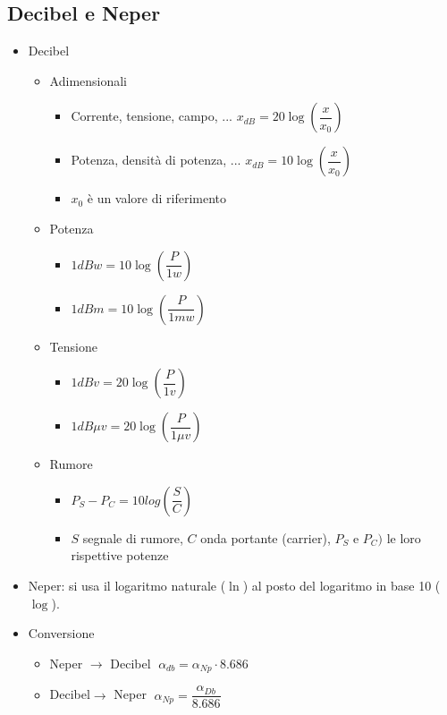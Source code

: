 \documentclass{article}
\begin{document}
\subsection{Decibel e Neper}
\begin{itemize}
	\item Decibel
	\begin{itemize}
		\item Adimensionali
		\begin{itemize}
			\item Corrente, tensione, campo, ... \( x_{dB} = 20 \log\left(\dfrac{x}{x_0}\right) \)
			\item Potenza, densità di potenza, ... \( x_{dB} = 10 \log\left(\dfrac{x}{x_0}\right) \)
			\item \(x_0\) è un valore di riferimento
		\end{itemize}
		\item Potenza 
		\begin{itemize}
			\item \(1 dBw = 10 \log\left(\dfrac{P}{1w}\right) \)
			\item \(1 dBm = 10 \log\left(\dfrac{P}{1mw}\right) \)
		\end{itemize}
		\item Tensione 
		\begin{itemize}
			\item \(1 dBv = 20 \log\left(\dfrac{P}{1v}\right) \)
			\item \(1 dB \mu v = 20 \log\left(\dfrac{P}{1 \mu v}\right) \)
		\end{itemize}
		\item Rumore
		\begin{itemize}
			\item \(P_S - P_C = 10 log \left( \dfrac{S}{C} \right) \)
			\item \(S\) segnale di rumore, \(C\) onda portante (carrier), \(P_S\) e \(P_C)\) le loro rispettive potenze
		\end{itemize}
	\end{itemize}
	\item Neper: si usa il logaritmo naturale (\( \ln \)) al posto del logaritmo in base 10 (\(\log\)).
	\item Conversione
	\begin{itemize}
		\item Neper \(\rightarrow\) Decibel \( \; \alpha_{db} = \alpha_{Np} \cdot 8.686 \)
		\item Decibel\(\rightarrow\) Neper \( \; \alpha_{Np} = \dfrac{\alpha_{Db}}{8.686} \)
	\end{itemize}
\end{itemize}
\end{document}

